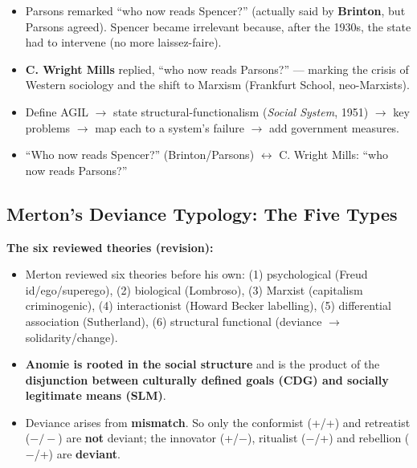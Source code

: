 \begin{DataFact}
\begin{itemize}
\item Parsons remarked ``who now reads Spencer?'' (actually said by \textbf{Brinton}, but Parsons agreed). Spencer became irrelevant because, after the 1930s, the state had to intervene (no more laissez-faire).
\item \textbf{C. Wright Mills} replied, ``who now reads Parsons?'' --- marking the crisis of Western sociology and the shift to Marxism (Frankfurt School, neo-Marxists).
\end{itemize}
\end{DataFact}

\begin{QuickRevision}
\begin{itemize}
\item Define AGIL $\rightarrow$ state structural-functionalism (\textit{Social System}, 1951) $\rightarrow$ key problems $\rightarrow$ map each to a system's failure $\rightarrow$ add government measures.
\item ``Who now reads Spencer?'' (Brinton/Parsons) $\leftrightarrow$ C. Wright Mills: ``who now reads Parsons?''
\end{itemize}
\end{QuickRevision}

\sectiondivider

\subsection{Merton's Deviance Typology: The Five Types}

\begin{DataFact}
\textbf{The six reviewed theories (revision):}
\begin{itemize}
\item Merton reviewed six theories before his own: (1) psychological (Freud id/ego/superego), (2) biological (Lombroso), (3) Marxist (capitalism criminogenic), (4) interactionist (Howard Becker labelling), (5) differential association (Sutherland), (6) structural functional (deviance $\rightarrow$ solidarity/change).
\end{itemize}
\end{DataFact}

\begin{KeyConcept}
\begin{itemize}
\item \textbf{Anomie is rooted in the social structure} and is the product of the \textbf{disjunction between culturally defined goals (CDG) and socially legitimate means (SLM)}.
\item Deviance arises from \textbf{mismatch}. So only the conformist (+/+) and retreatist ($-/-$) are \textbf{not} deviant; the innovator (+/$-$), ritualist ($-$/+) and rebellion ($-$/+) are \textbf{deviant}.
\end{itemize}
\end{KeyConcept}

